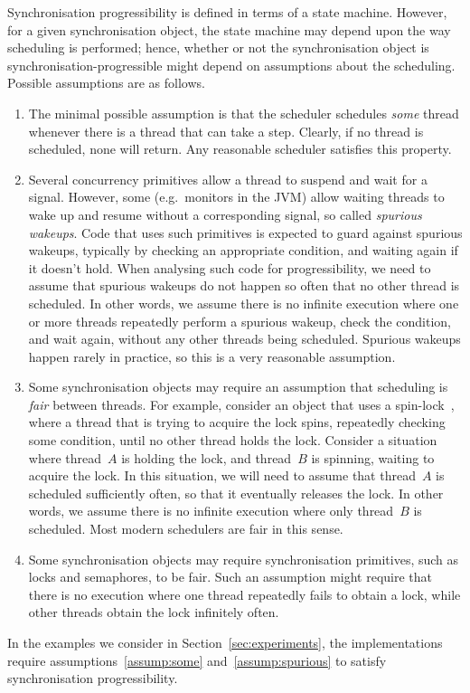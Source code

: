 Synchronisation progressibility is defined in terms of a state machine.
However, for a given synchronisation object, the state machine may depend upon
the way scheduling is performed; hence, whether or not the synchronisation
object is synchronisation-progressible might depend on assumptions about the
scheduling.  
Possible assumptions are as follows.
%
\begin{enumerate}
\item\label{assump:some} The minimal possible assumption is that the scheduler
  schedules \emph{some} thread whenever there is a thread that can take a
  step.  Clearly, if no thread is scheduled, none will return.  Any reasonable
  scheduler satisfies this property.

\item\label{assump:spurious} Several concurrency primitives allow a thread to
  suspend and wait for a signal.  However, some (e.g.~monitors in the JVM)
  allow waiting threads to wake up and resume without a corresponding signal,
  so called \emph{spurious wakeups}.  Code that uses such primitives is
  expected to guard against spurious wakeups, typically by checking an
  appropriate condition, and waiting again if it doesn't hold.  When analysing
  such code for progressibility, we need to assume that spurious wakeups do
  not happen so often that  no other thread is scheduled.  In other words,
  we assume there is no infinite execution where one or more threads
  repeatedly perform a spurious wakeup, check the condition, and wait again,
  without any other threads being scheduled.  Spurious wakeups happen rarely
  in practice, so this is a very reasonable assumption.

\item\label{assump:fair} Some synchronisation objects may require an
  assumption that scheduling is \emph{fair} between threads.  For example,
  consider an object that uses a spin-lock~\cite[Chapter 7]{herlihy-shavit},
  where a thread that is trying to acquire the lock spins, repeatedly checking
  some condition, until no other thread holds the lock.  Consider a situation
  where thread~$A$ is holding the lock, and thread~$B$ is spinning, waiting to
  acquire the lock.  In this situation, we will need to assume that thread~$A$
  is scheduled sufficiently often, so that it eventually releases the lock.
  In other words, we assume there is no infinite execution where only
  thread~$B$ is scheduled.  Most modern schedulers are fair in this sense.

\item Some synchronisation objects may require synchronisation primitives,
  such as locks and semaphores, to be fair.  Such an assumption might require
  that there is no execution where one thread repeatedly fails to obtain a
  lock, while other threads obtain the lock infinitely often.
\end{enumerate}
%
In the examples we consider in Section~\ref{sec:experiments}, the
implementations require assumptions~\ref{assump:some}
and~\ref{assump:spurious} to satisfy synchronisation progressibility. 

